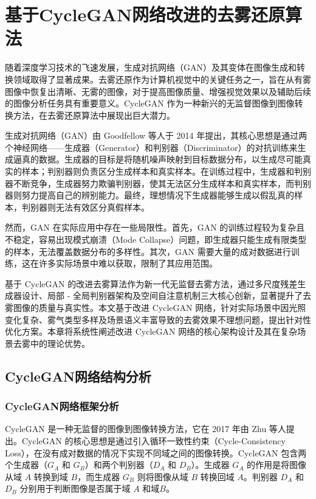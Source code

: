 \section{基于CycleGAN网络改进的去雾还原算法\label{方法A}}

随着深度学习技术的飞速发展，生成对抗网络（GAN）及其变体在图像生成和转换领域取得了显著成果。去雾还原作为计算机视觉中的关键任务之一，旨在从有雾图像中恢复出清晰、无雾的图像，对于提高图像质量、增强视觉效果以及辅助后续的图像分析任务具有重要意义。CycleGAN \cite{cgan}作为一种新兴的无监督图像到图像转换方法，在去雾还原算法中展现出巨大潜力。

生成对抗网络（GAN）由 Goodfellow 等人于 2014 年提出\cite{gan}，其核心思想是通过两个神经网络——生成器（Generator）和判别器（Discriminator）的对抗训练来生成逼真的数据。生成器的目标是将随机噪声映射到目标数据分布，以生成尽可能真实的样本；判别器则负责区分生成样本和真实样本。在训练过程中，生成器和判别器不断竞争，生成器努力欺骗判别器，使其无法区分生成样本和真实样本，而判别器则努力提高自己的辨别能力。最终，理想情况下生成器能够生成以假乱真的样本，判别器则无法有效区分真假样本。

然而，GAN 在实际应用中存在一些局限性。首先，GAN 的训练过程较为复杂且不稳定，容易出现模式崩溃（Mode Collapse）问题，即生成器只能生成有限类型的样本，无法覆盖数据分布的多样性。其次，GAN 需要大量的成对数据进行训练，这在许多实际场景中难以获取，限制了其应用范围。

基于 CycleGAN 的改进去雾算法作为新一代无监督去雾方法，通过多尺度残差生成器设计、局部 - 全局判别器架构及空间自注意机制三大核心创新，显著提升了去雾图像的质量与真实性。本文基于改进 CycleGAN 网络，针对实际场景中因光照变化复杂、雾气类型多样及场景语义丰富导致的去雾效果不理想问题，提出针对性优化方案。本章将系统性阐述改进 CycleGAN 网络的核心架构设计及其在复杂场景去雾中的理论优势。

\subsection{CycleGAN网络结构分析}

\subsubsection{CycleGAN网络框架分析}

CycleGAN 是一种无监督的图像到图像转换方法，它在 2017 年由 Zhu 等人提出。CycleGAN 的核心思想是通过引入循环一致性约束（Cycle-Consistency Loss），在没有成对数据的情况下实现不同域之间的图像转换。CycleGAN 包含两个生成器（$G_A$ 和 $G_B$）和两个判别器（$D_A$ 和 $D_B$）。生成器 $G_A$ 的作用是将图像从域 $A$ 转换到域 $B$，而生成器 $G_B$ 则将图像从域 $B$ 转换回域 $A$。判别器 $D_A$ 和 $D_B$ 分别用于判断图像是否属于域 $A$ 和域$B$。

